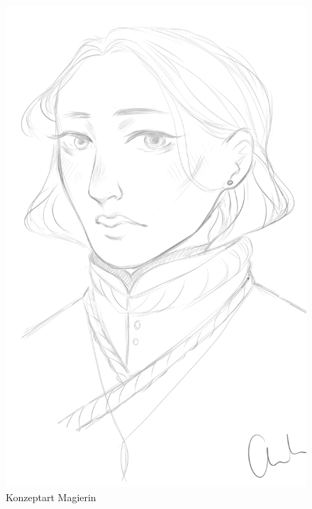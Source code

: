 \begin{figure}
	\centering
	\includegraphics[width=0.3\textheight]{Abbildungen/Abenteuer/Hauptcharaktere/magierin}
	\caption[Konzeptart Magierin]{Konzeptart Magierin}
	\label{fig:magierin}
\end{figure}


